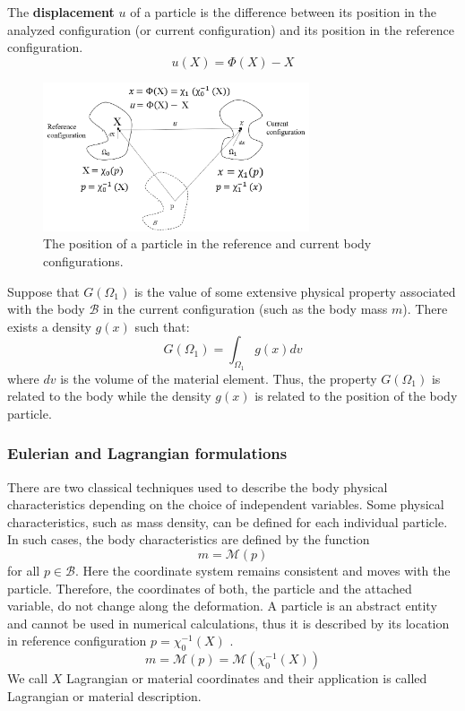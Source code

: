 The \textbf{displacement} $u$ of a particle is the difference between its position in the analyzed configuration (or current configuration) and its position in the reference configuration.
 \begin{equation}
 u(X) = \Phi(X) - X
 \end{equation}


\begin{figure}
\begin{center}
\includegraphics[width=0.7\textwidth,keepaspectratio]{figures/referenceFig.png} 
\caption{ The position of a particle in the reference and current body configurations.}
\label{reference_config_theory}
\end{center}
\end{figure}

Suppose that $G(\Omega_1)$ is the value of some extensive physical property  associated with the body $\mathcal{B}$ in the current configuration (such as the body mass $m$). There exists a density $g(x)$ such that:
 $$G(\Omega_1) = \int_{\Omega_1} g(x)dv$$  
 where $dv$ is the volume of the material element.
 Thus, the property $G(\Omega_1)$ is related to the body while the density $g(x)$ is related to the position of the body particle.
\subsubsection*{Eulerian and Lagrangian formulations}
There are two classical techniques used to describe the body physical characteristics depending on the choice of independent variables.
 Some physical characteristics, such as mass density, can be defined for each individual particle. In such cases, the body characteristics are defined by the function $$m = \mathcal{M}(p)$$ for all $p \in \mathcal{B}$. Here the coordinate system remains consistent and moves with the particle. Therefore, the coordinates of both, the particle and the attached variable, do not change along the deformation. A particle is an abstract entity and cannot be used in numerical calculations, thus it is described by its location in reference configuration $p= \chi_0^{-1}(X)$ .
 $$m =  \mathcal{M}(p) = \mathcal{M}(\chi_0^{-1}(X))$$
 We call $X$ Lagrangian or material coordinates and their application is called Lagrangian or material description.  
 

